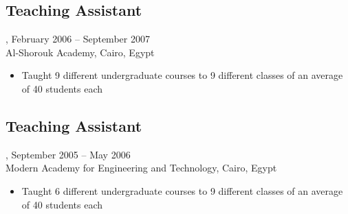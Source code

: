\subsection{Teaching Assistant}, February 2006 -- September 2007\\
Al-Shorouk Academy, Cairo, Egypt
\begin{itemize}
\item Taught 9 different undergraduate courses to 9 different classes of an average of 40 students each
\end{itemize}

\subsection{Teaching Assistant}, September 2005 -- May 2006\\
Modern Academy for Engineering and Technology, Cairo, Egypt
\begin{itemize}
\item Taught 6 different undergraduate courses to 9 different classes of an average of 40 students each
\end{itemize}
